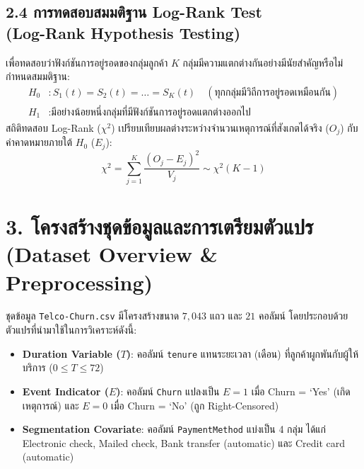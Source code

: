\documentclass[12pt,a4paper]{article}
\begin{document}
\subsection*{2.4 การทดสอบสมมติฐาน Log-Rank Test\\ \normalsize(Log-Rank Hypothesis Testing)}
เพื่อทดสอบว่าฟังก์ชันการอยู่รอดของกลุ่มลูกค้า $K$ กลุ่มมีความแตกต่างกันอย่างมีนัยสำคัญหรือไม่ กำหนดสมมติฐาน:
\begin{align*}
    H_0 &: S_1(t) = S_2(t) = \dots = S_K(t) \quad (\text{ทุกกลุ่มมีวิถีการอยู่รอดเหมือนกัน}) \\
    H_1 &: \text{มีอย่างน้อยหนึ่งกลุ่มที่มีฟังก์ชันการอยู่รอดแตกต่างออกไป}
\end{align*}
สถิติทดสอบ Log-Rank ($\chi^2$) เปรียบเทียบผลต่างระหว่างจำนวนเหตุการณ์ที่สังเกตได้จริง ($O_j$) กับค่าคาดหมายภายใต้ $H_0$ ($E_j$):
\begin{equation}
    \chi^2 = \sum_{j=1}^K \frac{(O_j - E_j)^2}{V_j} \sim \chi^2(K - 1)
\end{equation}

\section*{3. โครงสร้างชุดข้อมูลและการเตรียมตัวแปร\\ \large(Dataset Overview \& Preprocessing)}

ชุดข้อมูล \texttt{Telco-Churn.csv} มีโครงสร้างขนาด $7,043$ แถว และ $21$ คอลัมน์ โดยประกอบด้วยตัวแปรที่นำมาใช้ในการวิเคราะห์ดังนี้:
\begin{itemize}[leftmargin=18pt, itemsep=2pt]
    \item \textbf{Duration Variable ($T$)}: คอลัมน์ \texttt{tenure} แทนระยะเวลา (เดือน) ที่ลูกค้าผูกพันกับผู้ให้บริการ ($0 \le T \le 72$)
    \item \textbf{Event Indicator ($E$)}: คอลัมน์ \texttt{Churn} แปลงเป็น $E = 1$ เมื่อ Churn = `Yes' (เกิดเหตุการณ์) และ $E = 0$ เมื่อ Churn = `No' (ถูก Right-Censored)
    \item \textbf{Segmentation Covariate}: คอลัมน์ \texttt{PaymentMethod} แบ่งเป็น 4 กลุ่ม ได้แก่ Electronic check, Mailed check, Bank transfer (automatic) และ Credit card (automatic)
\end{itemize}

\begin{table}[H]
\centering
\caption{สถิติเชิงพรรณนาภาพรวมของชุดข้อมูล Telco Churn ($N = 7,043$)}
\end{table}
\end{document}
